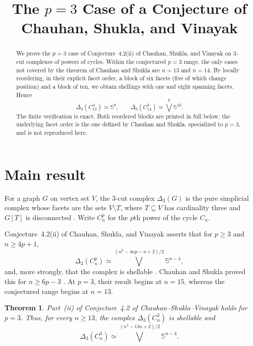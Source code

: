 \documentclass[11pt]{amsart}
\title[The $p=3$ case of a 3-cut conjecture]
{The $p=3$ Case of a Conjecture of
Chauhan, Shukla, and Vinayak}
\date{}
\newtheorem{theorem}{Theorem}
\theoremstyle{remark}
\newcommand{\Sph}{\mathbb S}
\begin{document}
\begin{abstract}
We prove the $p=3$ case of Conjecture~4.2(ii) of Chauhan, Shukla,
and Vinayak on $3$-cut complexes of powers of cycles.  Within the
conjectured $p=3$ range, the only cases not covered by the theorem of Chauhan
and Shukla are $n=13$ and $n=14$.
By locally reordering, in their explicit facet order, a block of six facets
(five of which change position) and a block of ten, we obtain shellings with
one and eight spanning facets.  Hence
\[
  \Delta_3(C_{13}^3)\simeq \Sph^9,
  \qquad
  \Delta_3(C_{14}^3)\simeq \bigvee^8 \Sph^{10}.
\]
The finite verification is exact.  Both reordered blocks are printed in full
below; the underlying facet order is the one defined by Chauhan and Shukla,
specialized to $p=3$, and is not reproduced here.
\end{abstract}

\maketitle

\section{Main result}

For a graph $G$ on vertex set $V$, the $3$-cut complex $\Delta_3(G)$ is the
pure simplicial complex whose facets are the sets $V\setminus T$, where
$T\subseteq V$ has cardinality three and $G[T]$ is disconnected
\cite{BayerEtAl,CSV}.  Write $C_n^p$ for the $p$th power of the cycle $C_n$.

Conjecture~4.2(ii) of Chauhan, Shukla, and Vinayak asserts that for $p\ge3$
and $n\ge4p+1$,
\begin{equation}\label{eq:conjecture}
  \Delta_3(C_n^p)
  \simeq
  \bigvee^{(n^2-4np-n+2)/2}\Sph^{n-4},
\end{equation}
and, more strongly, that the complex is shellable
\cite[Conjecture~4.2(ii)]{CSV}.  Chauhan and Shukla proved this for
$n\ge6p-3$ \cite[Theorem~1.4]{CS}.  At $p=3$, their result begins at
$n=15$, whereas the conjectured range begins at $n=13$.

\begin{theorem}\label{thm:main}
Part~\textup{(ii)} of Conjecture~4.2 of Chauhan--Shukla--Vinayak holds for
$p=3$.  Thus, for every $n\ge13$, the complex $\Delta_3(C_n^3)$ is
shellable and
\[
  \Delta_3(C_n^3)
  \simeq
  \bigvee^{(n^2-13n+2)/2}\Sph^{n-4}.
\]
\end{theorem}
\end{document}
